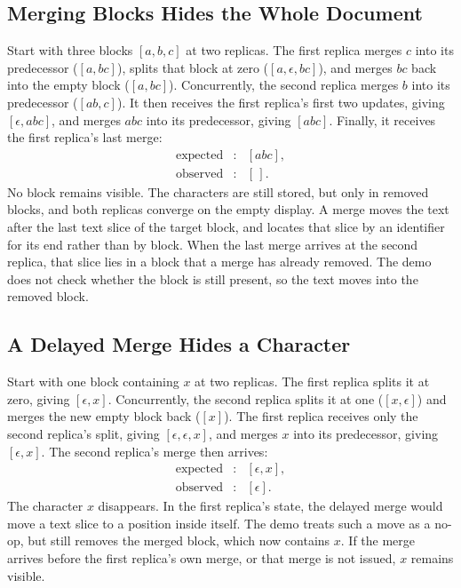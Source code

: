 \subsection{Merging Blocks Hides the Whole Document}
\label{app:notion-document-loss-bug}

Start with three blocks $[a,b,c]$ at two replicas. The first replica merges
$c$ into its predecessor ($[a,bc]$), splits that block at zero
($[a,\epsilon,bc]$), and merges $bc$ back into the empty block ($[a,bc]$).
Concurrently, the second replica merges $b$ into its predecessor ($[ab,c]$).
It then receives the first replica's first two updates, giving
$[\epsilon,abc]$, and merges $abc$ into its predecessor, giving $[abc]$.
Finally, it receives the first replica's last merge:
\[
\begin{array}{rcl}
\text{expected}&:&[abc],\\
\text{observed}&:&[\,].
\end{array}
\]
No block remains visible. The characters are still stored, but only in
removed blocks, and both replicas converge on the empty display. A merge
moves the text after the last text slice of the target block, and locates
that slice by an identifier for its end rather than by block. When the last
merge arrives at the second replica, that slice lies in a block that a merge
has already removed. The demo does not check whether the block is still
present, so the text moves into the removed block.

\subsection{A Delayed Merge Hides a Character}
\label{app:notion-character-loss-bug}

Start with one block containing $x$ at two replicas. The first replica splits
it at zero, giving $[\epsilon,x]$. Concurrently, the second replica splits it
at one ($[x,\epsilon]$) and merges the new empty block back ($[x]$). The
first replica receives only the second replica's split, giving
$[\epsilon,\epsilon,x]$, and merges $x$ into its predecessor, giving
$[\epsilon,x]$. The second replica's merge then arrives:
\[
\begin{array}{rcl}
\text{expected}&:&[\epsilon,x],\\
\text{observed}&:&[\epsilon].
\end{array}
\]
The character $x$ disappears. In the first replica's state, the delayed
merge would move a text slice to a position inside itself. The demo treats
such a move as a no-op, but still removes the merged block, which now
contains $x$. If the merge arrives before the first replica's own merge,
or that merge is not issued, $x$ remains visible.

